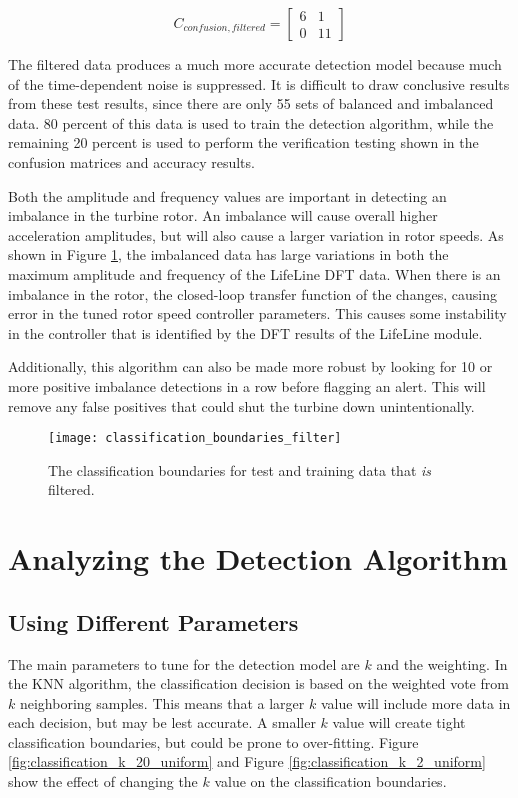 \begin{equation}
C_{confusion,filtered} = 
\begin{bmatrix}
	6 & 1 \\
	0 & 11
\end{bmatrix}
\end{equation}

The filtered data produces a much more accurate detection model because much of the time-dependent noise is suppressed.  It is difficult to draw conclusive results from these test results, since there are only 55 sets of balanced and imbalanced data.  80 percent of this data is used to train the detection algorithm, while the remaining 20 percent is used to perform the verification testing shown in the confusion matrices and accuracy results.

Both the amplitude and frequency values are important in detecting an imbalance in the turbine rotor.  An imbalance will cause overall higher acceleration amplitudes, but will also cause a larger variation in rotor speeds.  As shown in Figure  \ref{fig:classification_boundaries_filter}, the imbalanced data has large variations in both the maximum amplitude and frequency of the LifeLine DFT data.  When there is an imbalance in the rotor, the closed-loop transfer function of the changes, causing error in the tuned rotor speed controller parameters.  This causes some instability in the controller that is identified by the DFT results of the LifeLine module.

Additionally, this algorithm can also be made more robust by looking for 10 or more positive imbalance detections in a row before flagging an alert.  This will remove any false positives that could shut the turbine down unintentionally.

\begin{figure}
	\centering
	\texttt{[image: classification\_boundaries\_filter]}
	\decoRule
	\caption{The classification boundaries for test and training data that \textit{is} filtered.}
	\label{fig:classification_boundaries_filter}
\end{figure}


\section{Analyzing the Detection Algorithm}
\subsection{Using Different Parameters}
The main parameters to tune for the detection model are $k$ and the weighting.  In the KNN algorithm, the classification decision is based on the weighted vote from $k$ neighboring samples.  This means that a larger $k$ value will include more data in each decision, but may be lest accurate.  A smaller $k$ value will create tight classification boundaries, but could be prone to over-fitting.  Figure \ref{fig:classification_k_20_uniform} and Figure \ref{fig:classification_k_2_uniform} show the effect of changing the $k$ value on the classification boundaries.

